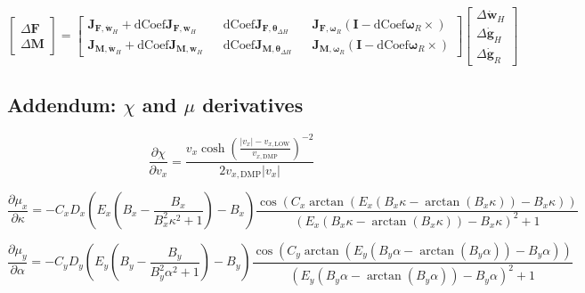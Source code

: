 \begin{equation}
    \begin{bmatrix}
        \Delta \mathbf{F} \\ \Delta \mathbf{M}
    \end{bmatrix} = \begin{bmatrix}
        \mathbf{J}_{\mathbf{F}, \dot{\mathbf{w}}_H} + \text{dCoef}\mathbf{J}_{\mathbf{F}, \mathbf{w}_H} && \text{dCoef}\mathbf{J}_{\mathbf{F}, \boldsymbol{\theta}_{\Delta H}} && \mathbf{J}_{\mathbf{F}, \boldsymbol{\omega}_R}\left(\mathbf{I} - \text{dCoef}\boldsymbol{\omega}_R\times\right)\\
        \mathbf{J}_{\mathbf{M}, \dot{\mathbf{w}}_H} + \text{dCoef}\mathbf{J}_{\mathbf{M}, \mathbf{w}_H} && \text{dCoef}\mathbf{J}_{\mathbf{M}, \boldsymbol{\theta}_{\Delta H}} && \mathbf{J}_{\mathbf{M}, \boldsymbol{\omega}_R}\left(\mathbf{I} - \text{dCoef}\boldsymbol{\omega}_R\times\right)
    \end{bmatrix}\begin{bmatrix}
        \Delta {\dot{\mathbf{w}}}_H  \\ \Delta \dot{\mathbf{g}}_H \\ \Delta \dot{\mathbf{g}}_R
    \end{bmatrix}
\end{equation}

\subsection{Addendum: $\chi$ and $\mu$ derivatives}
\label{ss:derivatives}

\begin{equation}
    \frac{\partial{\chi}}{\partial{v_x}} = \frac{v_x \cosh\left(\frac{|v_x| - v_{x,\text{LOW}}}{v_{x, \text{DMP}}}\right)^{-2}}{2v_{x, \text{DMP}}|v_x|}
\end{equation}

\begin{equation}
    \frac{\partial{\mu_x}}{\partial{\kappa}} = -C_xD_x\left(E_x\left(B_x - \frac{B_x}{B_x^2\kappa^2 + 1}\right) - B_x\right)\frac{\cos\left(C_x\arctan\left(E_x\left(B_x\kappa - \arctan(B_x\kappa)\right) - B_x\kappa\right)\right)}{(E_x(B_x\kappa - \arctan(B_x\kappa)) - B_x\kappa)^2 + 1}
\end{equation}

\begin{equation}
    \frac{\partial{\mu_y}}{\partial{\alpha}} = -C_yD_y\left(E_y\left(B_y - \frac{B_y}{B_y^2\alpha^2 + 1}\right) - B_y\right)\frac{\cos\left(C_y\arctan\left(E_y\left(B_y\alpha - \arctan(B_y\alpha)\right) - B_y\alpha\right)\right)}{(E_y(B_y\alpha - \arctan(B_y\alpha)) - B_y\alpha)^2 + 1}
\end{equation}


